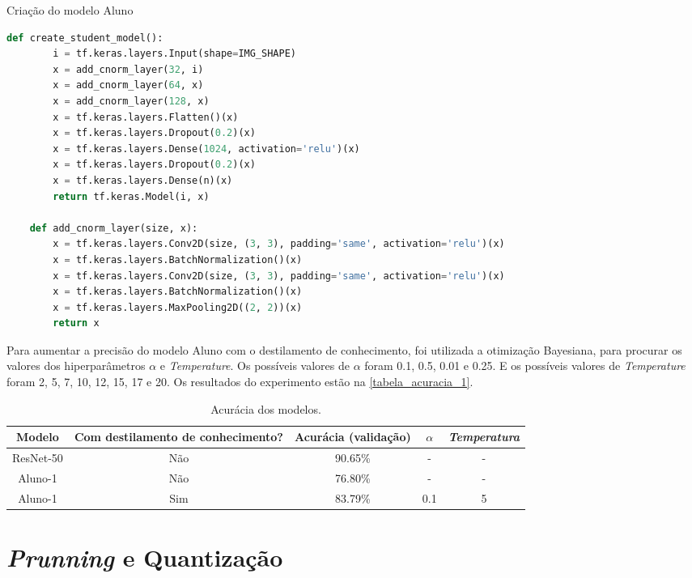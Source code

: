 \begin{codigo}[!htb]
    \caption{Criação do modelo Aluno}
    \label{res_aluno_1}
    \begin{lstlisting}[language = python]
	def create_student_model():
		i = tf.keras.layers.Input(shape=IMG_SHAPE)
		x = add_cnorm_layer(32, i)
		x = add_cnorm_layer(64, x)
		x = add_cnorm_layer(128, x)
		x = tf.keras.layers.Flatten()(x)
		x = tf.keras.layers.Dropout(0.2)(x)
		x = tf.keras.layers.Dense(1024, activation='relu')(x)
		x = tf.keras.layers.Dropout(0.2)(x)
		x = tf.keras.layers.Dense(n)(x)
		return tf.keras.Model(i, x)

	def add_cnorm_layer(size, x):
		x = tf.keras.layers.Conv2D(size, (3, 3), padding='same', activation='relu')(x)
		x = tf.keras.layers.BatchNormalization()(x)
		x = tf.keras.layers.Conv2D(size, (3, 3), padding='same', activation='relu')(x)
		x = tf.keras.layers.BatchNormalization()(x)
		x = tf.keras.layers.MaxPooling2D((2, 2))(x)
		return x
    \end{lstlisting}
\end{codigo}

Para aumentar a precisão do modelo Aluno com o destilamento de conhecimento, foi utilizada a otimização
Bayesiana, para procurar os valores dos hiperparâmetros $\alpha$ e \textit{Temperature}.
Os possíveis valores de $\alpha$ foram 0.1, 0.5, 0.01 e 0.25.
E os possíveis valores de \textit{Temperature} foram 2, 5, 7, 10, 12, 15, 17 e 20.
Os resultados do experimento estão na \autoref{tabela_acuracia_1}.

\begin{center}
\begin{table}[htb]
\ABNTEXfontereduzida
\caption[Acurácia dos modelos]{Acurácia dos modelos.}
\label{tabela_acuracia_1}
\begin{tabular}{ |c|c|c|c|c| }
	\hline
	\textbf{Modelo} & \textbf{Com destilamento de conhecimento?}  & \textbf{Acurácia (validação)}
		   & \textbf{$\alpha$} & \textbf{\textit{Temperatura}} \\
	\hline
	ResNet-50 	& 	Não 	& 	90.65\%	& 	- 	& 	-	 \\
	Aluno-1 	& 	Não 	& 	76.80\%	& 	- 	& 	-	 \\
	Aluno-1 	& 	Sim 	& 	83.79\%	& 	0.1 	& 	5	 \\
	\hline
\end{tabular}
\end{table}
\end{center}

\section{\textit{Prunning} e Quantização}
